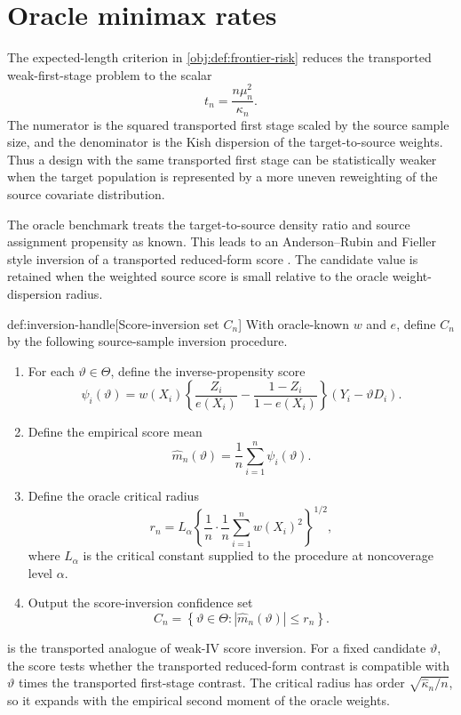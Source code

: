 \section{Oracle minimax rates}

The expected-length criterion in \cref{obj:def:frontier-risk} reduces the transported weak-first-stage problem to the scalar
\[
t_n=\frac{n\mu_n^2}{\kappa_n}.
\]
The numerator is the squared transported first stage scaled by the source sample size, and the denominator is the Kish dispersion of the target-to-source weights. Thus a design with the same transported first stage can be statistically weaker when the target population is represented by a more uneven reweighting of the source covariate distribution.

The oracle benchmark treats the target-to-source density ratio and source assignment propensity as known. This leads to an Anderson--Rubin and Fieller style inversion of a transported reduced-form score \citep{AndersonRubin1949,Fieller1954}. The candidate value is retained when the weighted source score is small relative to the oracle weight-dispersion radius.

\begin{algorithmv}{def:inversion-handle}[Score-inversion set $C_n$]
With oracle-known \(w\) and \(e\), define \(C_n\) by the following source-sample inversion procedure.
\begin{enumerate}
\item For each \(\vartheta\in\Theta\), define the inverse-propensity score
\[
\psi_i(\vartheta)
=
w(X_i)\left\{\frac{Z_i}{e(X_i)}-\frac{1-Z_i}{1-e(X_i)}\right\}(Y_i-\vartheta D_i).
\]

\item Define the empirical score mean
\[
\widehat m_n(\vartheta)
=
\frac{1}{n}\sum_{i=1}^n \psi_i(\vartheta).
\]

\item Define the oracle critical radius
\[
r_n
=
L_\alpha
\left\{
\frac{1}{n}\cdot \frac{1}{n}\sum_{i=1}^n w(X_i)^2
\right\}^{1/2},
\]
where \(L_\alpha\) is the critical constant supplied to the procedure at noncoverage level \(\alpha\).

\item Output the score-inversion confidence set
\[
C_n
=
\left\{
\vartheta\in\Theta:
\left|\widehat m_n(\vartheta)\right|\le r_n
\right\}.
\]
\end{enumerate}
\end{algorithmv}

 is the transported analogue of weak-IV score inversion. For a fixed candidate \(\vartheta\), the score tests whether the transported reduced-form contrast is compatible with \(\vartheta\) times the transported first-stage contrast. The critical radius has order \(\sqrt{\widehat\kappa_n/n}\), so it expands with the empirical second moment of the oracle weights.


